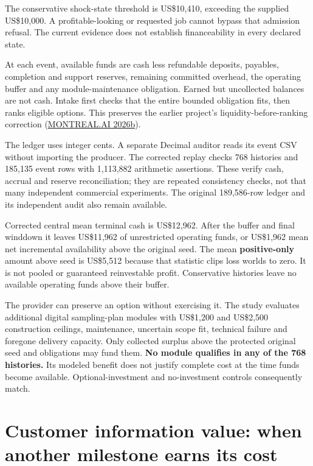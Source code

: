\documentclass[
  11pt,
  letterpaper,
]{article}
\begin{document}
The conservative shock-state threshold is US\$10,410, exceeding the
supplied US\$10,000. A profitable-looking or requested job cannot bypass
that admission refusal. The current evidence does not establish
financeability in every declared state.

At each event, available funds are cash less refundable deposits,
payables, completion and support reserves, remaining committed overhead,
the operating buffer and any module-maintenance obligation. Earned but
uncollected balances are not cash. Intake first checks that the entire
bounded obligation fits, then ranks eligible options. This preserves the
earlier project's liquidity-before-ranking correction
(\protect\hyperlink{ref-prior4979}{MONTREAL.AI 2026b}).

The ledger uses integer cents. A separate Decimal auditor reads its
event CSV without importing the producer. The corrected replay checks
768 histories and 185,135 event rows with 1,113,882 arithmetic
assertions. These verify cash, accrual and reserve reconciliation; they
are repeated consistency checks, not that many independent commercial
experiments. The original 189,586-row ledger and its independent audit
also remain available.

Corrected central mean terminal cash is US\$12,962. After the buffer and
final winddown it leaves US\$11,962 of unrestricted operating funds, or
US\$1,962 mean net incremental availability above the original seed. The
mean \textbf{positive-only} amount above seed is US\$5,512 because that
statistic clips loss worlds to zero. It is not pooled or guaranteed
reinvestable profit. Conservative histories leave no available operating
funds above their buffer.

The provider can preserve an option without exercising it. The study
evaluates additional digital sampling-plan modules with US\$1,200 and
US\$2,500 construction ceilings, maintenance, uncertain scope fit,
technical failure and foregone delivery capacity. Only collected surplus
above the protected original seed and obligations may fund them.
\textbf{No module qualifies in any of the 768 histories.} Its modeled
benefit does not justify complete cost at the time funds become
available. Optional-investment and no-investment controls consequently
match.

\hypertarget{customer-information-value-when-another-milestone-earns-its-cost}{%
\section{Customer information value: when another milestone earns its
cost}\label{customer-information-value-when-another-milestone-earns-its-cost}}
\end{document}
